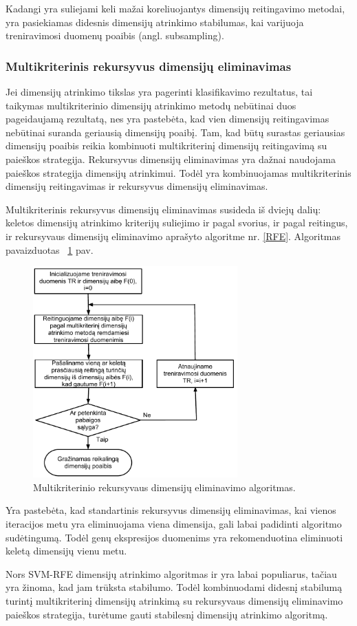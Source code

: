 Kadangi yra suliejami keli mažai koreliuojantys dimensijų reitingavimo metodai,
yra pasiekiamas didesnis dimensijų atrinkimo stabilumas, kai varijuoja 
treniravimosi duomenų poaibis (angl. subsampling).

\subsubsection{Multikriterinis rekursyvus dimensijų eliminavimas}

Jei dimensijų atrinkimo tikslas yra pagerinti klasifikavimo rezultatus, tai taikymas
multikriterinio dimensijų atrinkimo metodų nebūtinai duos pageidaujamą rezultatą,
nes yra pastebėta, kad vien dimensijų reitingavimas nebūtinai suranda geriausią dimensijų 
poaibį. Tam, kad būtų surastas geriausias dimensijų poaibis reikia kombinuoti
multikriterinį dimensijų reitingavimą su paieškos strategija. Rekursyvus 
dimensijų eliminavimas yra dažnai naudojama paieškos strategija dimensijų
atrinkimui. Todėl yra kombinuojamas multikriterinis dimensijų reitingavimas ir
rekursyvus dimensijų eliminavimas.

Multikriterinis rekursyvus dimensijų eliminavimas\cite{yang2011robust} susideda iš dviejų
dalių: keletos dimensijų atrinkimo kriterijų suliejimo ir pagal svorius, ir 
pagal reitingus, ir rekursyvaus dimensijų eliminavimo aprašyto algoritme 
nr. \ref{RFE}. Algoritmas pavaizduotas ~\ref{fig:figure6} pav.
\begin{figure}
 \centering
 \includegraphics[width=0.7\textwidth]{images/mcf-rfe_procedure.pdf}
 \caption{Multikriterinio rekursyvaus dimensijų eliminavimo algoritmas.}
 \label{fig:figure6}
\end{figure}

Yra pastebėta, kad standartinis rekursyvus dimensijų eliminavimas, kai vienos
iteracijos metu yra eliminuojama viena dimensija, gali labai padidinti 
algoritmo sudėtingumą. Todėl genų ekspresijos duomenims yra rekomenduotina
eliminuoti keletą dimensijų vienu metu.

Nors SVM-RFE dimensijų atrinkimo algoritmas ir yra labai populiarus, tačiau yra
žinoma, kad jam trūksta stabilumo. Todėl kombinuodami didesnį stabilumą turintį
multikriterinį dimensijų atrinkimą su rekursyvaus dimensijų eliminavimo paieškos
strategija, turėtume gauti stabilesnį dimensijų atrinkimo algoritmą.

